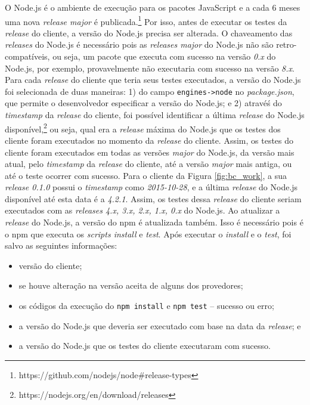 O \textsf{Node.js} é o ambiente de execução para os pacotes \textsf{JavaScript} e a cada 6 meses uma nova \textit{release major} é publicada.\footnote{https://github.com/nodejs/node\#release-types} Por isso, antes de executar os testes da \textit{release} do cliente, a versão do \textsf{Node.js} precisa ser alterada. O chaveamento das \textit{releases} do \textsf{Node.js} é necessário pois as \textit{releases major} do \textsf{Node.js} não são retro-compatíveis, ou seja, um pacote que executa com sucesso na versão \textit{0.x} do \textsf{Node.js}, por exemplo, provavelmente não executaria com sucesso na versão \textit{8.x}. Para cada \textit{release} do cliente que teria seus testes executados, a versão do \textsf{Node.js} foi selecionada de duas maneiras: 1) do campo \texttt{engines->node} no \textit{package.json}, que permite o desenvolvedor especificar a versão do \textsf{Node.js}; e 2) atravéś do \textit{timestamp} da \textit{release} do cliente, foi possível identificar a última \textit{release} do \textsf{Node.js} disponível,\footnote{https://nodejs.org/en/download/releases} ou seja, qual era a \textit{release} máxima do \textsf{Node.js} que os testes dos cliente foram executados no momento da \textit{release} do cliente. Assim, os testes do cliente foram executados em todas as versões \textit{major} do \textsf{Node.js}, da versão mais atual, pelo \textit{timestamp} da \textit{release} do cliente, até a versão \textit{major} mais antiga, ou até o teste ocorrer com sucesso. Para o cliente da Figura \ref{fig:bc_work}, a sua \textit{release 0.1.0} possui o \textit{timestamp} como \textit{2015-10-28}, e a última \textit{release} do \textsf{Node.js} disponível até esta data é a \textit{4.2.1}. Assim, os testes dessa \textit{release} do cliente seriam executados com as \textit{releases 4.x, 3.x, 2.x, 1.x, 0.x} do \textsf{Node.js}. Ao atualizar a \textit{release} do \textsf{Node.js}, a versão do \textsf{npm} é atualizada também. Isso é necessário pois é o \textsf{npm} que executa os \textit{scripts install} e \textit{test}. Após executar o \textit{install} e o \textit{test}, foi salvo as seguintes informações:

\begin{itemize}
    \item versão do cliente;
    \item se houve alteração na versão aceita de alguns dos provedores;
    \item os códigos da execução do \texttt{npm install} e \texttt{npm test} -- sucesso ou erro;
    \item a versão do \textsf{Node.js} que deveria ser executado com base na data da \textit{release}; e
    \item a versão do \textsf{Node.js} que os testes do cliente executaram com sucesso.
\end{itemize}{}

